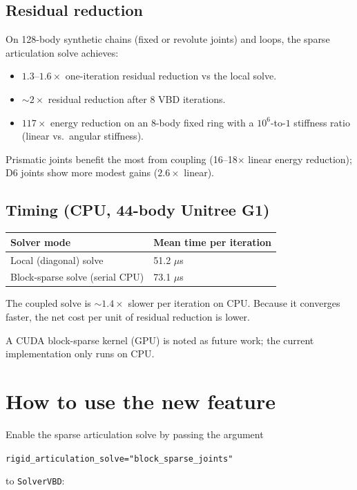 \documentclass[11pt,a4paper]{article}
\begin{document}
\subsection{Residual reduction}

On 128-body synthetic chains (fixed or revolute joints) and loops, the sparse
articulation solve achieves:
\begin{itemize}[nosep]
  \item $1.3$--$1.6\times$ one-iteration residual reduction vs the local solve.
  \item $\sim 2\times$ residual reduction after 8 VBD iterations.
  \item $117\times$ energy reduction on an 8-body fixed ring with a
        $10^6$-to-$1$ stiffness ratio (linear vs.\ angular stiffness).
\end{itemize}

Prismatic joints benefit the most from coupling (16--18$\times$ linear energy
reduction); D6 joints show more modest gains ($2.6\times$ linear).

\subsection{Timing (CPU, 44-body Unitree G1)}

\begin{center}
\begin{tabular}{ll}
\toprule
Solver mode & Mean time per iteration \\
\midrule
Local (diagonal) solve & 51.2 $\mu$s \\
Block-sparse solve (serial CPU) & 73.1 $\mu$s \\
\bottomrule
\end{tabular}
\end{center}

The coupled solve is $\sim 1.4\times$ slower per iteration on CPU.  Because it
converges faster, the net cost per unit of residual reduction is lower.

A CUDA block-sparse kernel (GPU) is noted as future work; the current
implementation only runs on CPU.

\section{How to use the new feature}

Enable the sparse articulation solve by passing the argument
\begin{center}\texttt{rigid\_articulation\_solve="block\_sparse\_joints"}\end{center}
to \texttt{SolverVBD}:
\end{document}
